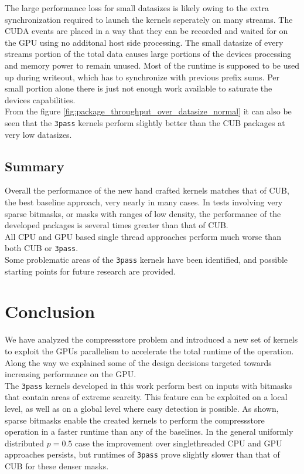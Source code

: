 \documentclass{tudscrreprt}
\begin{document}
			The large performance loss for small datasizes is likely owing to the extra synchronization required to launch the kernels seperately on many streams. The CUDA events are placed in a way that they can be recorded and waited for on the GPU using no additonal host side processing. The small datasize of every streams portion of the total data causes large portions of the devices processing and memory power to remain unused. Most of the runtime is supposed to be used up during writeout, which has to synchronize with previous prefix sums. Per small portion alone there is just not enough work available to saturate the devices capabilities. \\
			
			From the figure \ref{fig:package_throughput_over_datasize_normal} it can also be seen that the \texttt{3pass} kernels perform slightly better than the CUB packages at very low datasizes. \\
		
		\section{Summary}
			Overall the performance of the new hand crafted kernels matches that of CUB, the best baseline approach, very nearly in many cases. In tests involving very sparse bitmasks, or masks with ranges of low density, the performance of the developed packages is several times greater than that of CUB. \\
			All CPU and GPU based single thread approaches perform much worse than both CUB or \texttt{3pass}. \\
			
			Some problematic areas of the \texttt{3pass} kernels have been identified, and possible starting points for future research are provided. \\
		
	\chapter{Conclusion}
		We have analyzed the compressstore problem and introduced a new set of kernels to exploit the GPUs parallelism to accelerate the total runtime of the operation. Along the way we explained some of the design decisions targeted towards increasing performance on the GPU. \\
		The \texttt{3pass} kernels developed in this work perform best on inputs with bitmasks that contain areas of extreme scarcity. This feature can be exploited on a local level, as well as on a global level where easy detection is possible. As shown, sparse bitmasks enable the created kernels to perform the compressstore operation in a faster runtime than any of the baselines. In the general uniformly distributed $p=0.5$ case the improvement over singlethreaded CPU and GPU approaches persists, but runtimes of \texttt{3pass} prove slightly slower than that of CUB for these denser masks. \\
		
\end{document}
